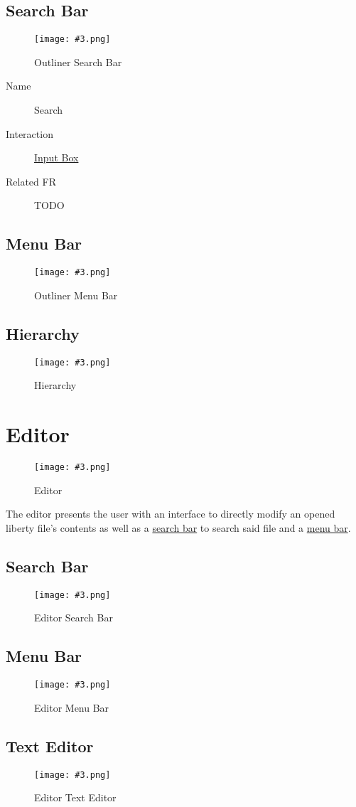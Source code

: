 \documentclass[10pt,a4paper]{report}
\newcommand{\refer}[2]{\hyperref[#1]{\textcolor{col:reference}{#2}}}
\newcommand{\h}[1]{\textcolor{col:highlight}{#1}}
\newcommand{\ui}[3]{
    \begin{description}
        \item[Name]{#1}
        \item[Interaction]{#2}
        \item[Related FR]{#3}
    \end{description}
}
\newcommand{\includeimage}[5]{
    \begin{figure}[H]
        #1
        \texttt{[image: \#3.png]}
        \caption{#4}
        \label{fig:#5}
    \end{figure}
}
\begin{document}
\subsection{Search Bar}
\label{sec:outliner:search}
\includeimage{}{0.4}{Outliner Search Bar}{Outliner Search Bar}{outliner_search_bar}
\ui{Search}{\refer{it:input_box}{Input Box}}{TODO}

\subsection{Menu Bar}
\label{sec:outliner:menu}

\includeimage{}{0.4}{Outliner Menu Bar}{Outliner Menu Bar}{outliner_menu_bar}

\subsection{Hierarchy}
\label{sec:outliner:hierarchy}

\includeimage{}{0.4}{Hierarchy}{Hierarchy}{hierarchy}

\section{Editor}
\label{sec:editor}
\includeimage{}{0.4}{Editor}{Editor}{editor}
The \h{editor} presents the user with an interface to directly modify an opened liberty file's contents as well as a \refer{sec:editor:search}{search bar} to search said file and a \refer{sec:editor:menu}{menu bar}.

\subsection{Search Bar}
\label{sec:editor:search}

\includeimage{}{0.4}{Editor Search Bar}{Editor Search Bar}{editor_search_bar}

\subsection{Menu Bar}
\label{sec:editor:menu}

\includeimage{}{0.4}{Editor Menu Bar}{Editor Menu Bar}{editor_menu_bar}

\subsection{Text Editor}
\label{sec:editor:text_editor}

\includeimage{}{0.4}{Editor Text Editor}{Editor Text Editor}{editor_text_editor}
\end{document}
